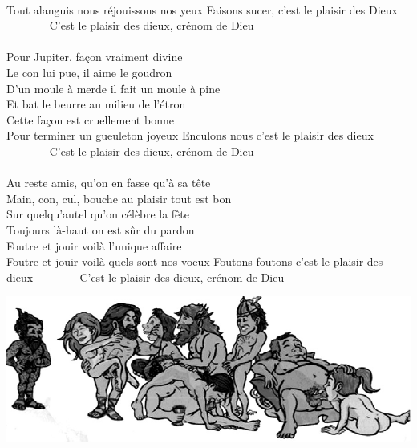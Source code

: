 \\Tout alanguis nous réjouissons nos yeux
{Faisons sucer, c'est le plaisir des Dieux  ~~~~~~~}
C'est le plaisir des dieux, crénom de Dieu
\\\\Pour Jupiter, façon vraiment divine
\\Le con lui pue, il aime le goudron
\\D'un moule à merde il fait un moule à pine
\\Et bat le beurre au milieu de l'étron
\\Cette façon est cruellement bonne
\\Pour terminer un gueuleton joyeux
{Enculons nous c'est le plaisir des dieux  ~~~~~~~}
C'est le plaisir des dieux, crénom de Dieu
\\\\Au reste amis, qu'on en fasse qu'à sa tête
\\Main, con, cul, bouche au plaisir tout est bon
\\Sur quelqu'autel qu'on célèbre la fête
\\Toujours là-haut on est sûr du pardon
\\Foutre et jouir voilà l'unique affaire
\\Foutre et jouir voilà quels sont nos voeux
{Foutons foutons c'est le plaisir des dieux  ~~~~~~~}
C'est le plaisir des dieux, crénom de Dieu
\begin{center}
   \includegraphics[width=1.1\textwidth]{images/plaisir_dieux.jpg}
 \end{center}

\breakpage
